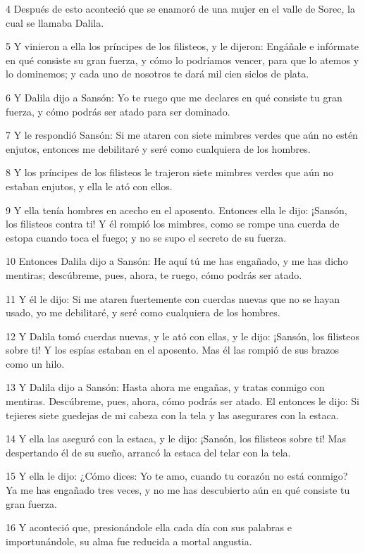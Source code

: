 \par 4 Después de esto aconteció que se enamoró de una mujer en el valle de Sorec, la cual se llamaba Dalila.
\par 5 Y vinieron a ella los príncipes de los filisteos, y le dijeron: Engáñale e infórmate en qué consiste su gran fuerza, y cómo lo podríamos vencer, para que lo atemos y lo dominemos; y cada uno de nosotros te dará mil cien siclos de plata.
\par 6 Y Dalila dijo a Sansón: Yo te ruego que me declares en qué consiste tu gran fuerza, y cómo podrás ser atado para ser dominado.
\par 7 Y le respondió Sansón: Si me ataren con siete mimbres verdes que aún no estén enjutos, entonces me debilitaré y seré como cualquiera de los hombres.
\par 8 Y los príncipes de los filisteos le trajeron siete mimbres verdes que aún no estaban enjutos, y ella le ató con ellos.
\par 9 Y ella tenía hombres en acecho en el aposento. Entonces ella le dijo: ¡Sansón, los filisteos contra ti! Y él rompió los mimbres, como se rompe una cuerda de estopa cuando toca el fuego; y no se supo el secreto de su fuerza.
\par 10 Entonces Dalila dijo a Sansón: He aquí tú me has engañado, y me has dicho mentiras; descúbreme, pues, ahora, te ruego, cómo podrás ser atado.
\par 11 Y él le dijo: Si me ataren fuertemente con cuerdas nuevas que no se hayan usado, yo me debilitaré, y seré como cualquiera de los hombres.
\par 12 Y Dalila tomó cuerdas nuevas, y le ató con ellas, y le dijo: ¡Sansón, los filisteos sobre ti! Y los espías estaban en el aposento. Mas él las rompió de sus brazos como un hilo.
\par 13 Y Dalila dijo a Sansón: Hasta ahora me engañas, y tratas conmigo con mentiras. Descúbreme, pues, ahora, cómo podrás ser atado. El entonces le dijo: Si tejieres siete guedejas de mi cabeza con la tela y las asegurares con la estaca.
\par 14 Y ella las aseguró con la estaca, y le dijo: ¡Sansón, los filisteos sobre ti! Mas despertando él de su sueño, arrancó la estaca del telar con la tela.
\par 15 Y ella le dijo: ¿Cómo dices: Yo te amo, cuando tu corazón no está conmigo? Ya me has engañado tres veces, y no me has descubierto aún en qué consiste tu gran fuerza.
\par 16 Y aconteció que, presionándole ella cada día con sus palabras e importunándole, su alma fue reducida a mortal angustia.

